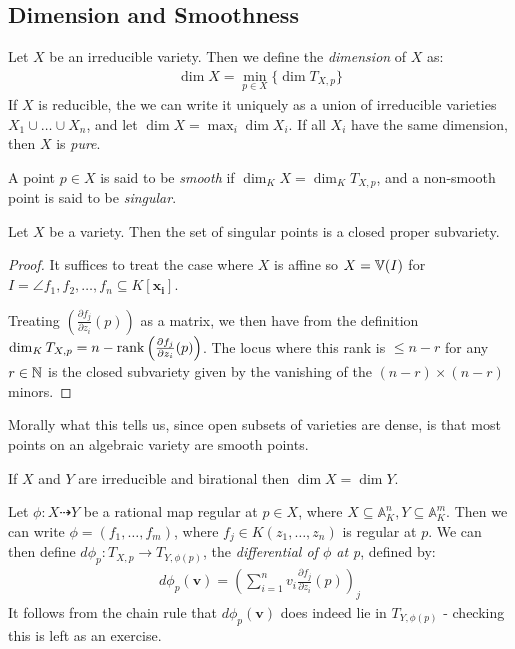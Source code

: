 \documentclass[10pt,a4paper,rgb]{article}
\newcommand{\A}{\mathbb{A}}
\begin{document}
\subsection{Dimension and Smoothness}
Let $X$ be an irreducible variety. Then we define the \emph{dimension} of $X$ as:
\begin{align*}
\dim X = \min_{p \in X} \{\dim T_{X,p}\}
\end{align*}
If $X$ is reducible, the we can write it uniquely as a union of irreducible varieties $X_1 \cup \ldots \cup X_n$, and let $\dim X = \max_{i}\dim X_i$. If all $X_i$ have the same dimension, then $X$ is \emph{pure}.

A point $p \in X$ is said to be \emph{smooth} if $\dim_K X = \dim_K T_{X, p}$, and a non-smooth point is said to be \emph{singular}.

\begin{proposition}
Let $X$ be a variety. Then the set of singular points is a closed proper subvariety.
\end{proposition}
\begin{proof}
It suffices to treat the case where $X$ is affine so $X  = \mathbb{V}(I)$ for $I = \angle{f_1, f_2, \ldots, f_n} \subseteq K[\mathbf{x_i}]$.

Treating $\left(\frac{\partial f_j}{\partial z_i}(p)\right)$ as a matrix, we then have from the definition $\dim_K T_{X,p} = n-\operatorname{rank} \left(\frac{\partial f_j}{\partial z_i}(p)\right)$. The locus where this rank is $\leq n-r$ for any $r \in \mathbb{N}$ is the closed subvariety given by the vanishing of the $(n-r)\times (n-r)$ minors.
\end{proof}
Morally what this tells us, since open subsets of varieties are dense, is that most points on an algebraic variety are smooth points.

\begin{proposition}
If $X$ and $Y$ are irreducible and birational then $\dim X = \dim Y$.
\end{proposition}

Let $\phi : X \dashrightarrow Y$ be a rational map regular at $p \in X$, where $X \subseteq \A_K^n, Y \subseteq \A_K^m$. Then we can write $\phi = (f_1, \ldots, f_m)$, where $f_j \in K(z_1, \ldots, z_n)$ is regular at $p$. We can then define $d\phi_p : T_{X,p} \to T_{Y, \phi(p)}$, the \emph{differential of $\phi$ at p}, defined by:
\begin{align*}
d\phi_p(\mathbf{v}) = \left(\sum_{i=1}^n v_i \frac{\partial f_j}{\partial z_i}(p)\right)_j
\end{align*}
It follows from the chain rule that $d\phi_p(\mathbf{v})$ does indeed lie in $T_{Y, \phi(p)}$ - checking this is left as an exercise.
\end{document}
